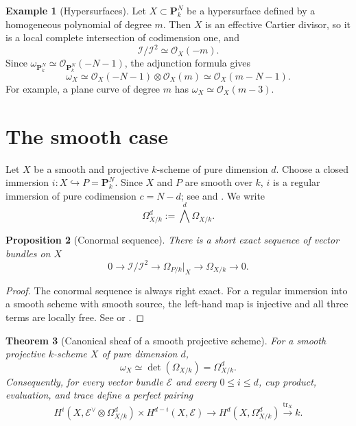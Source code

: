\documentclass[11pt,a4paper]{article}
\newtheorem{theorem}{Theorem}[section]
\newtheorem{proposition}[theorem]{Proposition}
\theoremstyle{definition}
\newtheorem{example}[theorem]{Example}
\theoremstyle{remark}
\newcommand{\OO}{\mathcal O}
\newcommand{\II}{\mathcal I}
\newcommand{\EE}{\mathcal E}
\newcommand{\PP}{\mathbf P}
\newcommand{\tr}{\operatorname{tr}}
\newcommand{\dual}{^{\vee}}
\newcommand{\determinant}{\operatorname{det}}
\begin{document}
\begin{example}[Hypersurfaces]
Let $X\subset\PP^N_k$ be a hypersurface defined by a homogeneous polynomial of
degree $m$. Then $X$ is an effective Cartier divisor, so it is a local
complete intersection of codimension one, and
\[
  \II/\II^2\simeq\OO_X(-m).
\]
Since $\omega_{\PP^N_k}\simeq\OO_{\PP^N_k}(-N-1)$, the adjunction formula
gives
\[
  \omega_X
  \simeq\OO_X(-N-1)\otimes\OO_X(m)
  \simeq\OO_X(m-N-1).
\]
For example, a plane curve of degree $m$ has
$\omega_X\simeq\OO_X(m-3)$.
\end{example}

\section{The smooth case}

Let $X$ be a smooth and projective $k$-scheme of pure dimension $d$. Choose a
closed immersion $i:X\hookrightarrow P=\PP^N_k$. Since $X$ and $P$ are
smooth over $k$, $i$ is a regular immersion of pure codimension $c=N-d$; see
\cite[Chapter II, Theorem 8.17]{HartshorneAG} and
\cite[Tag 0H1G]{Stacks}.
We write
\[
  \Omega^d_{X/k}:=\bigwedge^d\Omega_{X/k}.
\]

\begin{proposition}[Conormal sequence]
\label{prop:conormal-sequence}
There is a short exact sequence of vector bundles on $X$
\begin{equation}\label{eq:conormal-sequence}
  0\longrightarrow \II/\II^2
  \longrightarrow \Omega_{P/k}|_X
  \longrightarrow \Omega_{X/k}
  \longrightarrow 0.
\end{equation}
\end{proposition}

\begin{proof}
The conormal sequence is always right exact.  For a regular immersion into a
smooth scheme with smooth source, the left-hand map is injective and all
three terms are locally free.  See
\cite[Chapter II, Proposition 8.12 and Theorem 8.17]{HartshorneAG} or
\cite[Tag 06BB]{Stacks}.
\end{proof}

\begin{theorem}[Canonical sheaf of a smooth projective scheme]
\label{thm:smooth-canonical}
For a smooth projective $k$-scheme $X$ of pure dimension $d$,
\begin{equation}\label{eq:smooth-canonical}
  \omega_X\simeq\determinant(\Omega_{X/k})=\Omega^d_{X/k}.
\end{equation}
Consequently, for every vector bundle $\EE$ and every $0\leq i\leq d$, cup
product, evaluation, and trace define a perfect pairing
\[
  H^i(X,\EE\dual\otimes\Omega^d_{X/k})
  \times H^{d-i}(X,\EE)
  \longrightarrow H^d(X,\Omega^d_{X/k})
  \xrightarrow{\tr_X}k.
\]
\end{theorem}
\end{document}
